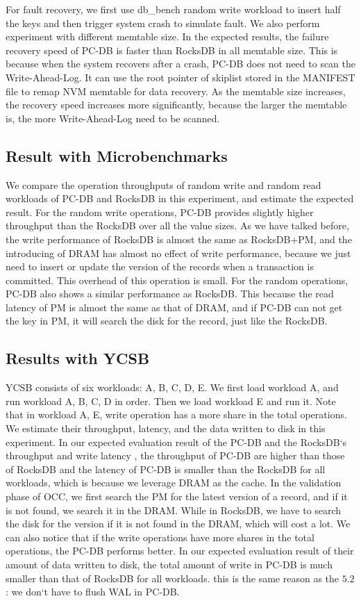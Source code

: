 For fault recovery, we first use  db\_bench random write workload to insert half the keys and then trigger system crash to simulate fault. We also perform experiment with different memtable size. In the expected results, the failure recovery speed of PC-DB is faster than RocksDB in all memtable size. This is because when the system recovers after a crash, PC-DB does not need to scan the Write-Ahead-Log. It can use the root pointer of skiplist stored in the MANIFEST file to remap NVM memtable for data recovery. As the memtable size increases, the recovery speed increases more significantly, because the larger the memtable is, the more Write-Ahead-Log need to be scanned.
\subsection{Result with Microbenchmarks}
We compare the operation throughputs of random write and random read workloads of PC-DB and RocksDB in this experiment, and estimate the expected result.
For the random write operations, PC-DB provides slightly higher throughput than the RocksDB over all the value sizes. As we have talked before, the write performance of RocksDB is almost the same as RocksDB+PM, and the introducing of DRAM has almost no effect of write performance, because we just need to insert or update the version of the records when a transaction is committed. This overhead of this operation is small. 
For the random operations, PC-DB also shows a similar performance as RocksDB. This because the read latency of PM is almost the same as that of DRAM, and if PC-DB can not get the key in PM, it will search the disk for the record, just like the RocksDB.

\subsection{Results with YCSB}
YCSB consists of six workloads: A, B, C, D, E. We first load workload A, and run workload A, B, C, D in order. Then we load workload E and run it. Note that in workload A, E, write operation has a more share in the total operations. We estimate their throughput, latency, and the data written to disk in this experiment.
In our expected evaluation result of the PC-DB and the RocksDB`s throughput and write latency , the throughput of PC-DB are higher than those of RocksDB and the latency of PC-DB is smaller than the RocksDB for all workloads, which is because we leverage DRAM as the cache. In the validation phase of OCC, we first search the PM for the latest version of a record, and if it is not found, we search it in the DRAM. While in RocksDB, we have to search the disk for the version if it is not found in the DRAM, which will cost a lot. We can also notice that if the write operations have more shares in the total operations, the PC-DB performs better.
In our expected evaluation result of their amount of data written to disk, the total amount of write in PC-DB is much smaller than that of RocksDB for all workloads. this is the same reason as the $5.2$: we don`t have to flush WAL in PC-DB.